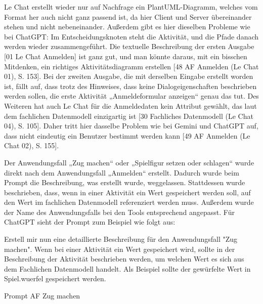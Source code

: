 Le Chat erstellt wieder nur auf Nachfrage ein PlantUML-Diagramm, welches vom Format her auch nicht ganz passend ist, da hier Client und 
Server übereinander stehen und nicht nebeneinander. Außerdem gibt es hier dieselben Probleme wie bei ChatGPT: Im Entscheidungsknoten steht 
die Aktivität, und die Pfade danach werden wieder zusammengeführt. Die textuelle Beschreibung der ersten Ausgabe [01 Le Chat Anmelden] ist 
ganz gut, und man könnte daraus, mit ein bisschen Mitdenken, ein richtiges Aktivitätsdiagramm erstellen [48 AF Anmelden (Le Chat 01), S. 153]. 
Bei der zweiten Ausgabe, die mit derselben Eingabe erstellt worden ist, fällt auf, dass trotz des Hinweises, dass keine Dialogeigenschaften 
beschrieben werden sollen, die erste Aktivität „Anmeldeformular anzeigen“ genau das tut. Des Weiteren hat auch Le Chat für die Anmeldedaten 
kein Attribut gewählt, das laut dem fachlichen Datenmodell einzigartig ist [30 Fachliches Datenmodell (Le Chat 04), S. 105]. Daher tritt hier 
dasselbe Problem wie bei Gemini und ChatGPT auf, dass nicht eindeutig ein Benutzer bestimmt werden kann [49 AF Anmelden (Le Chat 02), S. 155].

Der Anwendungsfall „Zug machen“ oder „Spielfigur setzen oder schlagen“ wurde direkt nach dem Anwendungsfall „Anmelden“ erstellt. Dadurch wurde 
beim Prompt die Beschreibung, was erstellt wurde, weggelassen. Stattdessen wurde beschrieben, dass, wenn in einer Aktivität ein Wert gespeichert 
werden soll, auf den Wert im fachlichen Datenmodell referenziert werden muss. Außerdem wurde der Name des Anwendungsfalls bei den Tools 
entsprechend angepasst. Für ChatGPT sieht der Prompt zum Beispiel wie folgt aus:

\begin{prompt}[H]
    \begin{tcolorbox}[colback=gray!20, colframe=gray!20, boxrule=0pt, sharp corners] 
        Erstell mir nun eine detaillierte Beschreibung für den Anwendungsfall "Zug machen". Wenn bei einer Aktivität ein Wert gespeichert wird, sollte 
        in der Beschreibung der Aktivität beschrieben werden, um welchen Wert es sich aus dem Fachlichen Datenmodell handelt. Als Beispiel sollte der 
        gewürfelte Wert in Spiel.wuerfel gespeichert werden.
        \vfill
    \end{tcolorbox}
    \caption{Prompt AF Zug machen}
    \label{Prompt AF Zug Machen}
\end{prompt}

